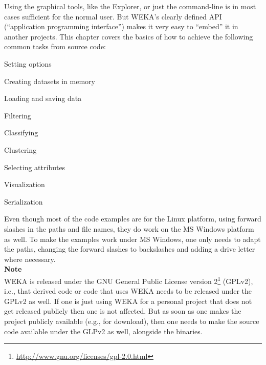 %
%
%
%


Using the graphical tools, like the Explorer, or just the command-line is in
most cases sufficient for the normal user. But WEKA's clearly defined API
(``application programming interface'') makes it very easy to ``embed'' it in
another projects. This chapter covers the basics of how to achieve the
following common tasks from source code:
\begin{tight_itemize}
	\item Setting options
	\item Creating datasets in memory
	\item Loading and saving data
	\item Filtering
	\item Classifying
	\item Clustering
	\item Selecting attributes
	\item Visualization
	\item Serialization
\end{tight_itemize}
Even though most of the code examples are for the Linux platform, using forward
slashes in the paths and file names, they do work on the MS Windows platform as
well. To make the examples work under MS Windows, one only needs to adapt the
paths, changing the forward slashes to backslashes and adding a drive letter
where necessary. \\

\noindent \textbf{Note} \\
\noindent WEKA is released under the GNU General Public License version
2\footnote{\url{http://www.gnu.org/licenses/gpl-2.0.html}{}} (GPLv2), i.e., that
derived
code or code that uses WEKA needs to be released under the GPLv2 as well. If
one is just using WEKA for a personal project that does not get released
publicly then one is not affected. But as soon as one makes the project
publicly available (e.g., for download), then one needs to make the source code
available under the GLPv2 as well, alongside the binaries.

